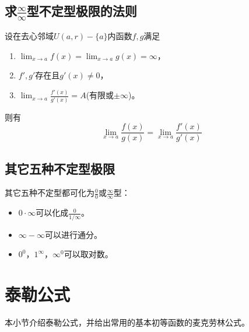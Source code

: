 \subsection{求$\frac{\infty}{\infty}$型不定型极限的法则}
\begin{theorem}
  设在去心邻域$U(a,r)-\{a\}$内函数$f,g$满足
  \begin{enumerate}
    \item
    $\lim_{x\to a} f(x) = \lim_{x\to a}g(x) = \infty$，
    \item
    $f',g'$存在且$g'(x) \neq 0$，
    \item
    $\lim_{x\to a} \frac{f'(x)}{g'(x)}=A$(有限或$\pm\infty$)。
  \end{enumerate}
  则有
  \begin{displaymath}
    \lim_{x\to a}\frac{f(x)}{g(x)}=\lim_{x\to a} \frac{f'(x)}{g'(x)}
  \end{displaymath}
\end{theorem}

\subsection{其它五种不定型极限}
其它五种不定型都可化为$\frac{0}{0}$或$\frac{\infty}{\infty}$型：
\begin{itemize}
  \item
  $0\cdot\infty$可以化成$\frac{0}{1/\infty}$。
  \item
  $\infty - \infty$可以进行通分。
  \item
  $0^0$，$1^{\infty}$，$\infty^0$可以取对数。
\end{itemize}

\section{泰勒公式}
本小节介绍泰勒公式，并给出常用的基本初等函数的麦克劳林公式。

